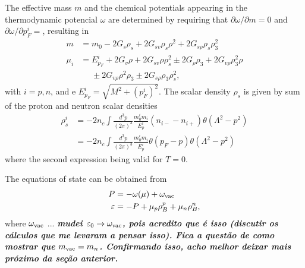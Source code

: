 \documentclass[prc, reprint, amsmath, linenumbers,10pt]{revtex4-1}
\newcommand{\comment}[1]{{\bf\textit{#1}}}
\begin{document}
The effective mass $m$ and the chemical potentials appearing in the thermodynamic potencial $\omega$ are determined by requiring that $\partial\omega/\partial m = 0$ and $\partial\omega/\partial p_F^i = $, resulting in
\begin{align}\label{Eq:Gap}
	m &= m_0 - 2G_s\rho_s + 2G_{sv}\rho_s\rho^2 + 2 G_{s\rho}\rho_s\rho_3^2 \\
	\mu_i &= E_{p_F}^i + 2G_v\rho + 2G_{sv}\rho\rho_s^2 \pm 2G_\rho\rho_3+2G_{v\rho}\rho_3^2\rho \nonumber \\
	&\phantom{=} \pm 2G_{v\rho}\rho^2\rho_3 \pm 2 G_{s\rho}\rho_3\rho_s^2,
\end{align}
%
with $i = p,n$, and e $E_{p_F}^i = \sqrt{M^2 + (p_F^i)^2}$. The scalar density $\rho_s$ is given by sum of the proton and neutron scalar densities
\begin{align}
	\rho_s^i &= - 2 n_c \int \frac{d^3p}{(2\pi)^3}\frac{m_0^i m_i}{E_p^i}(n_{i-} - n_{i+})\theta(\Lambda^2 - p^2) \\
	&= - 2 n_c \int \frac{d^3p}{(2\pi)^3}\frac{m_0^i m_i}{E_p^i}\theta(p_F - p)\theta(\Lambda^2 - p^2)
\end{align}
%
where the second expression being valid for $T = 0$.

The equations of state can be obtained from
\begin{align}
	P &= -\omega(\mu) + \omega_{\rm{vac}} \\
	\varepsilon &= -P + \mu_p \rho_B^p + \mu_n \rho_B^n,
\end{align}
%
where $\omega_{\rm{vac}}$ ... \comment{mudei $\varepsilon_0 \to \omega_{\rm{vac}}$, pois acredito que é isso (discutir os cálculos que me levaram a pensar isso). Fica a questão de como mostrar que $m_{\rm{vac}} = m_n$. Confirmando isso, acho melhor deixar mais próximo da seção anterior.} 
\end{document}
